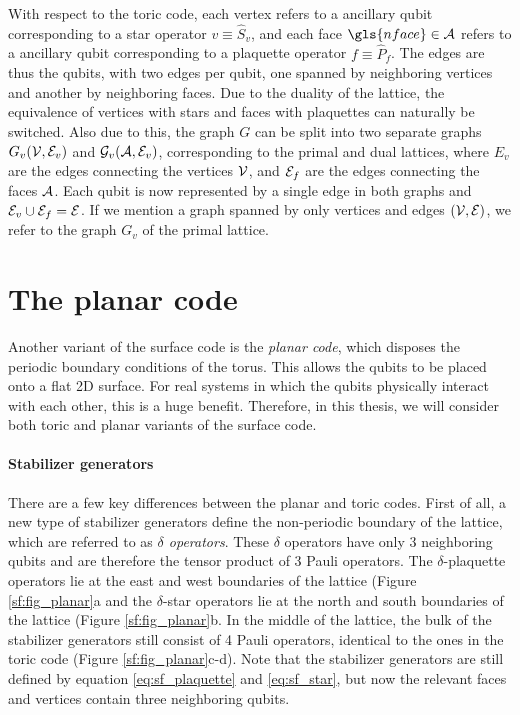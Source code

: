 With respect to the toric code, each vertex refers to a ancillary qubit corresponding to a star operator $v\equiv \hat{S}_v$, and each face $\gls{nface}\in \m{A}$ refers to a ancillary qubit corresponding to a plaquette operator $f\equiv \hat{P}_f$. The edges are thus the qubits, with two edges per qubit, one spanned by neighboring vertices and another by neighboring faces. Due to the duality of the lattice, the equivalence of vertices with stars and faces with plaquettes can naturally be switched. Also due to this, the graph $G$ can be split into two separate graphs $G_v(\mathcal{V}, \mathcal{E}_v)$ and $\mathcal{G}_v(\mathcal{A}, \mathcal{E}_v)$, corresponding to the primal and dual lattices, where $E_v$ are the edges connecting the vertices $\mathcal{V}$, and $\mathcal{E}_f$ are the edges connecting the faces $\mathcal{A}$. Each qubit is now represented by a single edge in both graphs and $\mathcal{E}_v\cup \mathcal{E}_f=\mathcal{E}$. If we mention a graph spanned by only vertices and edges $(\mathcal{V},\mathcal{E})$, we refer to the graph $G_v$ of the primal lattice. 

\section{The planar code}\label{sec:surface_planar}
Another variant of the surface code is the \emph{planar code}, which disposes the periodic boundary conditions of the torus. This allows the qubits to be placed onto a flat 2D surface. For real systems in which the qubits physically interact with each other, this is a huge benefit. Therefore, in this thesis, we will consider both toric and planar variants of the surface code.


\paragraph{Stabilizer generators}
There are a few key differences between the planar and toric codes. First of all, a new type of stabilizer generators define the non-periodic boundary of the lattice, which are referred to as \emph{$\delta$ operators}. These $\delta$ operators have only 3 neighboring qubits and are therefore the tensor product of 3 Pauli operators. The $\delta$-plaquette operators lie at the east and west boundaries of the lattice (Figure \ref{sf:fig_planar}a and the $\delta$-star operators lie at the north and south boundaries of the lattice (Figure \ref{sf:fig_planar}b. In the middle of the lattice, the bulk of the stabilizer generators still consist of 4 Pauli operators, identical to the ones in the toric code (Figure \ref{sf:fig_planar}c-d). Note that the stabilizer generators are still defined by equation \eqref{eq:sf_plaquette} and \eqref{eq:sf_star}, but now the relevant faces and vertices contain three neighboring qubits.

